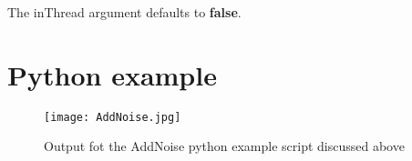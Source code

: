 The inThread argument defaults to \textbf{false}.

\section{Python example}

\begin{singlespace}

\end{singlespace}


\begin{figure}[H]
\centering
\texttt{[image: AddNoise.jpg]}
\caption{Output fot the AddNoise python example script discussed above}
\label{fig:addNoiseFig}
\end{figure}




